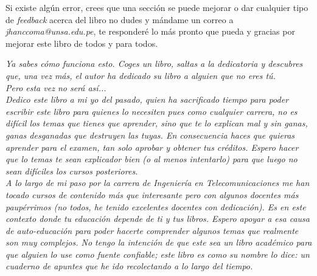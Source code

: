 \documentclass[
	12pt, %
	fleqn, %
	a4paper, %
	oneside, %
]{LegrandOrangeBook}
\begin{document}
\noindent Si existe algún error, crees que una sección se puede mejorar o dar cualquier tipo de \textit{feedback} acerca del libro no dudes y mándame un correo a \textit{jhanccoma@unsa.edu.pe}, te responderé lo más pronto que pueda y gracias por mejorar este libro de todos y para todos.
\clearpage
\begin{center}
    \thispagestyle{empty}
    \vspace*{\fill}
    \textit{Ya sabes cómo funciona esto. Coges un libro, saltas a la dedicatoria y descubres que, una vez más, el autor ha dedicado su libro a alguien que no eres tú.\\
    Pero esta vez no será así...\\
    Dedico este libro a mi yo del pasado, quien ha sacrificado tiempo para poder escribir este libro para quienes lo necesiten pues como cualquier carrera, no es difícil los temas que tienes que aprender, sino que te lo explican mal y sin ganas, ganas desganadas que destruyen las tuyas. En consecuencia haces que quieras aprender para el examen, tan solo aprobar y obtener tus créditos. Espero hacer que lo temas te sean explicador bien (o al menos intentarlo) para que luego no sean difíciles los cursos posteriores.\\
    A lo largo de mi paso por la carrera de Ingeniería en Telecomunicaciones me han tocado cursos de contenido más que interesante pero con algunos docentes más paupérrimos (no todos, he tenido excelentes docentes con dedicación). Es en este contexto donde tu educación depende de ti y tus libros. Espero apoyar a esa causa de auto-educación para poder hacerte comprender algunos temas que realmente son muy complejos. No tengo la intención de que este sea un libro académico para que alguien lo use como fuente confiable; este libro es como su nombre lo dice: un cuaderno de apuntes que he ido recolectando a lo largo del tiempo.}
    \vspace*{\fill}
\end{center}
\clearpage

\end{document}
